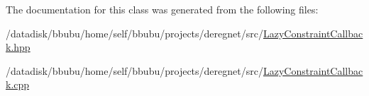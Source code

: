 The documentation for this class was generated from the following files\+:\begin{DoxyCompactItemize}
\item 
/datadisk/bbubu/home/self/bbubu/projects/deregnet/src/\hyperlink{LazyConstraintCallback_8hpp}{Lazy\+Constraint\+Callback.\+hpp}\item 
/datadisk/bbubu/home/self/bbubu/projects/deregnet/src/\hyperlink{LazyConstraintCallback_8cpp}{Lazy\+Constraint\+Callback.\+cpp}\end{DoxyCompactItemize}
